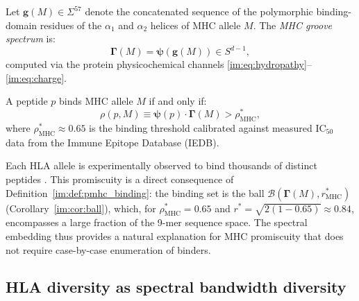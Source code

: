 \begin{definition}
\label{im:def:mhc_spectrum}
Let $\mathbf{g}(M) \in \Sigma^{57}$ denote the concatenated sequence of the
polymorphic binding-domain residues of the $\alpha_1$ and $\alpha_2$ helices
of MHC allele $M$. The \emph{MHC groove spectrum} is:
\begin{equation}
  \bm{\Gamma}(M) = \bm{\psi}(\mathbf{g}(M)) \in S^{d-1},
  \label{im:eq:mhc_spectrum}
\end{equation}
computed via the protein physicochemical channels
\eqref{im:eq:hydropathy}--\eqref{im:eq:charge}.
\end{definition}

\begin{definition}
\label{im:def:pmhc_binding}
A peptide $p$ binds MHC allele $M$ if and only if:
\begin{equation}
  \rho(p, M) \equiv \bm{\psi}(p)\cdot\bm{\Gamma}(M) > \rho^*_{\mathrm{MHC}},
  \label{im:eq:pmhc_binding}
\end{equation}
where $\rho^*_{\mathrm{MHC}} \approx 0.65$ is the binding threshold calibrated
against measured $\mathrm{IC}_{50}$ data from the Immune Epitope Database
(IEDB).
\end{definition}

\begin{remark}
Each HLA allele is experimentally observed to bind thousands of distinct
peptides \citep{sette1999,neefjes2011}. This promiscuity is a direct
consequence of Definition~\ref{im:def:pmhc_binding}: the binding set is the
ball $\mathcal{B}(\bm{\Gamma}(M), r^*_{\mathrm{MHC}})$
(Corollary~\ref{im:cor:ball}), which, for $\rho^*_{\mathrm{MHC}} = 0.65$ and
$r^* = \sqrt{2(1-0.65)} \approx 0.84$, encompasses a large fraction of the
9-mer sequence space. The spectral embedding thus provides a natural explanation
for MHC promiscuity that does not require case-by-case enumeration of binders.
\end{remark}

\subsection{HLA diversity as spectral bandwidth diversity}
\label{im:sec:hla_diversity}


